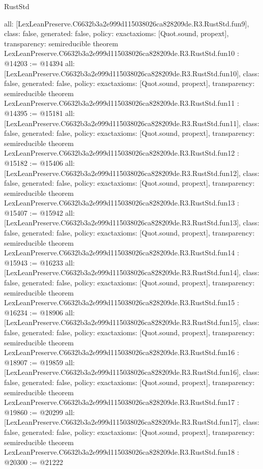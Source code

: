\begin{lexlean}{RustStd}
\begin{coremodule}
{  all: [LexLeanPreserve.C6632b3a2e999d115038026ca828209de.R3.RustStd.fun9],
  class: false,
  generated: false,
  policy: exact{axioms: [Quot.sound, propext]},
  transparency: semireducible
}
theorem LexLeanPreserve.C6632b3a2e999d115038026ca828209de.R3.RustStd.fun10 : @14203 := @14394 {
  all: [LexLeanPreserve.C6632b3a2e999d115038026ca828209de.R3.RustStd.fun10],
  class: false,
  generated: false,
  policy: exact{axioms: [Quot.sound, propext]},
  transparency: semireducible
}
theorem LexLeanPreserve.C6632b3a2e999d115038026ca828209de.R3.RustStd.fun11 : @14395 := @15181 {
  all: [LexLeanPreserve.C6632b3a2e999d115038026ca828209de.R3.RustStd.fun11],
  class: false,
  generated: false,
  policy: exact{axioms: [Quot.sound, propext]},
  transparency: semireducible
}
theorem LexLeanPreserve.C6632b3a2e999d115038026ca828209de.R3.RustStd.fun12 : @15182 := @15406 {
  all: [LexLeanPreserve.C6632b3a2e999d115038026ca828209de.R3.RustStd.fun12],
  class: false,
  generated: false,
  policy: exact{axioms: [Quot.sound, propext]},
  transparency: semireducible
}
theorem LexLeanPreserve.C6632b3a2e999d115038026ca828209de.R3.RustStd.fun13 : @15407 := @15942 {
  all: [LexLeanPreserve.C6632b3a2e999d115038026ca828209de.R3.RustStd.fun13],
  class: false,
  generated: false,
  policy: exact{axioms: [Quot.sound, propext]},
  transparency: semireducible
}
theorem LexLeanPreserve.C6632b3a2e999d115038026ca828209de.R3.RustStd.fun14 : @15943 := @16233 {
  all: [LexLeanPreserve.C6632b3a2e999d115038026ca828209de.R3.RustStd.fun14],
  class: false,
  generated: false,
  policy: exact{axioms: [Quot.sound, propext]},
  transparency: semireducible
}
theorem LexLeanPreserve.C6632b3a2e999d115038026ca828209de.R3.RustStd.fun15 : @16234 := @18906 {
  all: [LexLeanPreserve.C6632b3a2e999d115038026ca828209de.R3.RustStd.fun15],
  class: false,
  generated: false,
  policy: exact{axioms: [Quot.sound, propext]},
  transparency: semireducible
}
theorem LexLeanPreserve.C6632b3a2e999d115038026ca828209de.R3.RustStd.fun16 : @18907 := @19859 {
  all: [LexLeanPreserve.C6632b3a2e999d115038026ca828209de.R3.RustStd.fun16],
  class: false,
  generated: false,
  policy: exact{axioms: [Quot.sound, propext]},
  transparency: semireducible
}
theorem LexLeanPreserve.C6632b3a2e999d115038026ca828209de.R3.RustStd.fun17 : @19860 := @20299 {
  all: [LexLeanPreserve.C6632b3a2e999d115038026ca828209de.R3.RustStd.fun17],
  class: false,
  generated: false,
  policy: exact{axioms: [Quot.sound, propext]},
  transparency: semireducible
}
theorem LexLeanPreserve.C6632b3a2e999d115038026ca828209de.R3.RustStd.fun18 : @20300 := @21222 {
}
\end{coremodule}
\end{lexlean}
